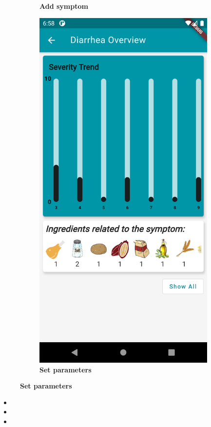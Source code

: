 \documentclass [12pt]{article}
\begin{document}
\begin{description}[leftmargin=1cm,rightmargin=1cm]
\begin{figure}[h!]
\begin{subfigure}[tr]{0.3\linewidth}
\caption{\textbf{Add symptom}}
\end{subfigure}
\hspace*{\fill}
\begin{subfigure}[tr]{0.3\linewidth}
\includegraphics[width=\linewidth]{statistics3.PNG}
\caption{\textbf{Set parameters}}
\end{subfigure}
\hspace*{\fill}
\end{figure}
\begin{itemize}[•]
\item 
\item 
\item 
\end{itemize}


\end{description}
\end{document}
